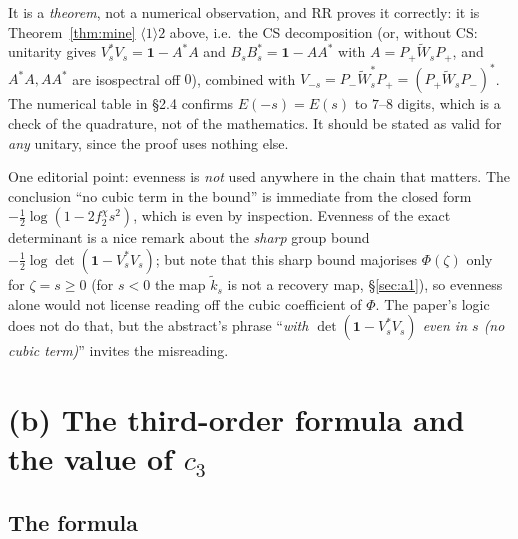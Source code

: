 \documentclass[11pt]{article}
\newcommand{\Wt}{\widetilde W}\newcommand{\kt}{\widetilde k}
\newcommand{\Pp}{P_+}\newcommand{\Pm}{P_-}\newcommand{\Om}{\Omega}\newcommand{\one}{\mathbf 1}
\begin{document}
\begin{verdictok}
It is a \emph{theorem}, not a numerical observation, and RR proves it correctly: it is
Theorem~\ref{thm:mine} $\langle1\rangle2$ above, i.e.\ the CS decomposition (or, without CS: unitarity
gives $V_s^*V_s=\one-A^*A$ and $B_sB_s^*=\one-AA^*$ with $A=\Pp\Wt_s\Pp$, and $A^*A,AA^*$ are
isospectral off $0$), combined with $V_{-s}=\Pm\Wt_s^*\Pp=(\Pp\Wt_s\Pm)^*$.  The numerical table in
\S2.4 confirms $E(-s)=E(s)$ to $7$--$8$ digits, which is a check of the quadrature, not of the
mathematics.  It should be stated as valid for \emph{any} unitary, since the proof uses nothing else.

One editorial point: evenness is \emph{not} used anywhere in the chain that matters.  The conclusion
``no cubic term in the bound'' is immediate from the closed form $-\frac12\log(1-2f_2^\chi s^2)$,
which is even by inspection.  Evenness of the exact determinant is a nice remark about the
\emph{sharp} group bound $-\frac12\log\det(\one-V_s^*V_s)$; but note that this sharp bound majorises
$\Phi(\zeta)$ only for $\zeta=s\ge0$ (for $s<0$ the map $\kt_s$ is not a recovery map, \S\ref{sec:a1}),
so evenness alone would not license reading off the cubic coefficient of $\Phi$.  The paper's logic
does not do that, but the abstract's phrase ``\emph{with $\det(\one-V_s^*V_s)$ even in $s$
(no cubic term)}'' invites the misreading.
\end{verdictok}

\section{(b) The third-order formula and the value of $c_3$}\label{sec:b}

\subsection{The formula}
\end{document}
